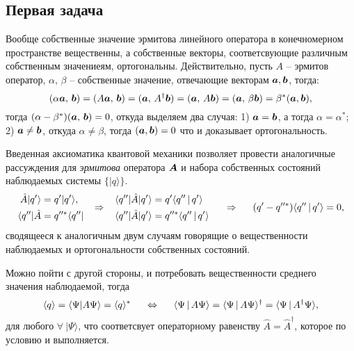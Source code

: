 \subsection*{Первая задача}

Вообще собственные значение эрмитова линейного оператора в конечномерном пространстве вещественны, а собственные векторы, соответсвующие различным собственным значениеям, ортогональны. Действительно, пусть $A$ -- эрмитов оператор, $\alpha,\, \beta$ -- собственные значение, отвечающие векторам $\mbox{\boldmath $a$}, \mbox{\boldmath $b$}$, тогда:
\begin{equation*}
    (\alpha \mbox{\boldmath $a$},\, \mbox{\boldmath $b$}) = (A \mbox{\boldmath $a$},\, \mbox{\boldmath $b$}) = 
    (\mbox{\boldmath $a$},\, A^\dag \mbox{\boldmath $b$}) = (\mbox{\boldmath $a$},\, A \mbox{\boldmath $b$}) = (\mbox{\boldmath $a$},\, \beta \mbox{\boldmath $b$}) = \beta^* (\mbox{\boldmath $a$}, \mbox{\boldmath $b$}),
\end{equation*}
тогда $(\alpha - \beta^*) (\mbox{\boldmath $a$},\, \mbox{\boldmath $b$}) = 0$, откуда выделяем два случая: 1) $\mbox{\boldmath $a$} = \mbox{\boldmath $b$}$, а тогда $\alpha = \alpha^*$; 2) $\mbox{\boldmath $a$} \neq \mbox{\boldmath $b$}$, откуда $\alpha \neq \beta$, тогда $(\mbox{\boldmath $a$}, \mbox{\boldmath $b$}) = 0$ что и доказывает ортогональность.

Введенная аксиоматика квантовой механики позволяет провести аналогичные рассуждения для \textit{эрмитова} оператора $\mbox{\boldmath $A$}$ и набора собственных состояний наблюдаемых системы $\{|q\rangle\}$. 
\begin{equation*}
    \left.\begin{aligned}
        \hat{A} |q'\rangle &= q' |q'\rangle, \\
        \langle q''| \hat{A} &= q''^* \langle q''| 
    \end{aligned}\right.
    \hspace{0.25cm} \Rightarrow \hspace{0.25cm}
    \left.\begin{aligned}
        \langle q''| \hat{A} | q' \rangle &= q' \langle q'' \,|\, q' \rangle \\
        \langle q''| \hat{A} | q' \rangle &= q''^* \langle q'' \,|\, q' \rangle 
    \end{aligned}\right.
    \hspace{0.5cm} \Rightarrow \hspace{0.5cm}
    (q'-q''^*) \langle q'' \,|\, q' \rangle = 0,
\end{equation*}
сводящееся к аналогичным двум случаям говорящие о вещественности наблюдаемых и ортогональности собственных состояний.

Можно пойти с другой стороны, и потребовать вещественности среднего значения наблюдаемой, тогда
\begin{equation*}
    \langle q\rangle = \langle \Psi | A \Psi \rangle = \langle q\rangle^*
    \hspace{5 mm} \Leftrightarrow \hspace{5 mm} 
    \langle \Psi \,|\, A\Psi \rangle = \langle \Psi \,|\, A \Psi \rangle^\dag = \langle \Psi \,|\, A^\dag \Psi \rangle,
\end{equation*}
для любого $\forall \ | \Psi\rangle $, что соответсвует операторному равенству $\hat{A} = \hat{A}^\dag$, которое по условию и выполняется. 




